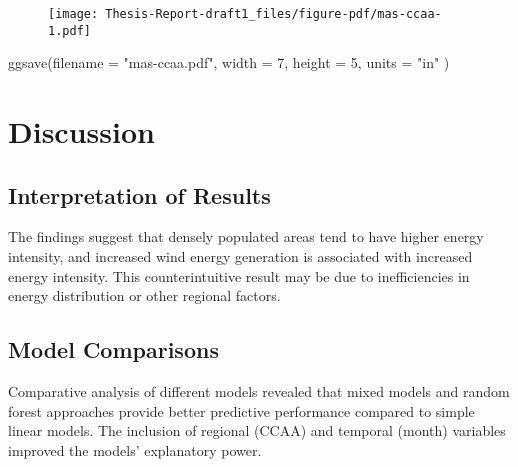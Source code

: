 \documentclass[
]{report}
\newenvironment{Shaded}{\begin{snugshade}}{\end{snugshade}}
\newcommand{\AttributeTok}[1]{\textcolor[rgb]{0.40,0.45,0.13}{#1}}
\newcommand{\DecValTok}[1]{\textcolor[rgb]{0.68,0.00,0.00}{#1}}
\newcommand{\FunctionTok}[1]{\textcolor[rgb]{0.28,0.35,0.67}{#1}}
\newcommand{\NormalTok}[1]{\textcolor[rgb]{0.00,0.23,0.31}{#1}}
\newcommand{\StringTok}[1]{\textcolor[rgb]{0.13,0.47,0.30}{#1}}
\begin{document}
\begin{figure}[H]

{\centering \texttt{[image: Thesis-Report-draft1\_files/figure-pdf/mas-ccaa-1.pdf]}

}

\end{figure}

\begin{Shaded}
\begin{Highlighting}[]
\FunctionTok{ggsave}\NormalTok{(}\AttributeTok{filename =} \StringTok{"mas{-}ccaa.pdf"}\NormalTok{, }\AttributeTok{width =} \DecValTok{7}\NormalTok{, }\AttributeTok{height =} \DecValTok{5}\NormalTok{, }\AttributeTok{units =} \StringTok{"in"}\NormalTok{ )}
\end{Highlighting}
\end{Shaded}

\hypertarget{discussion}{%
\chapter{Discussion}\label{discussion}}

\hypertarget{interpretation-of-results}{%
\section{Interpretation of Results}\label{interpretation-of-results}}

The findings suggest that densely populated areas tend to have higher
energy intensity, and increased wind energy generation is associated
with increased energy intensity. This counterintuitive result may be due
to inefficiencies in energy distribution or other regional factors.

\hypertarget{model-comparisons}{%
\section{Model Comparisons}\label{model-comparisons}}

Comparative analysis of different models revealed that mixed models and
random forest approaches provide better predictive performance compared
to simple linear models. The inclusion of regional (CCAA) and temporal
(month) variables improved the models' explanatory power.
\end{document}
